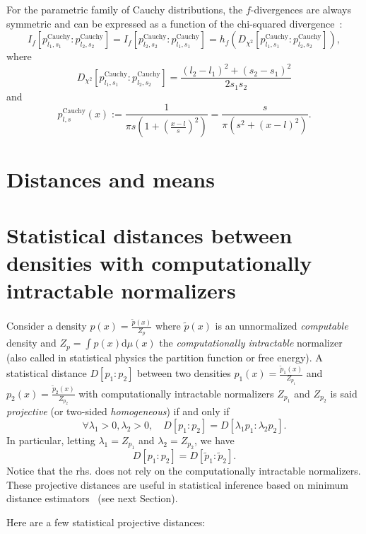 \documentclass[11pt]{article}
\def\dmu{\mathrm{d}\mu}
\def\dmu{\mathrm{d}\mu}
\def\Cauchy{\mathrm{Cauchy}}
\begin{document}
For the parametric family of Cauchy distributions, the $f$-divergences are always symmetric and can be expressed as a function of the chi-squared divergence~\cite{fdivCauchy-2021}:
$$
I_f[p_{l_1,s_1}^\Cauchy:p_{l_2,s_2}^\Cauchy]=I_f[p_{l_2,s_2}^\Cauchy:p_{l_1,s_1}^\Cauchy]=h_f(D_{\chi^2}[p_{l_1,s_1}^\Cauchy:p_{l_2,s_2}^\Cauchy]),
$$
where
$$
D_{\chi^2}[p_{l_1,s_1}^\Cauchy:p_{l_2,s_2}^\Cauchy]=\frac{(l_2-l_1)^2+(s_2-s_1)^2}{2s_1s_2}
$$
and
$$
p_{l,s}^\Cauchy(x) := \frac{1}{\pi s\left(1+\left(\frac{x-l}{s}\right)^2\right)}=\frac{s}{\pi (s^2+(x-l)^2)}.
$$


\section{Distances and means}



\section{Statistical distances between densities with computationally intractable normalizers}

Consider a density $p(x)=\frac{\tilde p(x)}{Z_p}$ where $\tilde p(x)$ is an unnormalized {\em computable} density 
and $Z_p=\int p(x) \dmu(x)$ the {\em computationally intractable} normalizer (also called in statistical physics the partition function or free energy).
A statistical distance $D[p_1:p_2]$ between two densities $p_1(x)=\frac{\tilde p_1(x)}{Z_{p_1}}$ and $p_2(x)=\frac{\tilde p_2(x)}{Z_{p_2}}$ with computationally intractable normalizers $Z_{p_1}$ and $Z_{p_2}$ is said {\em projective} (or two-sided {\em homogeneous}) if and only if
$$
\forall \lambda_1>0,\lambda_2>0,\quad D[p_1:p_2]=D[\lambda_1p_1:\lambda_2 p_2].
$$
In particular, letting $\lambda_1=Z_{p_1}$ and $\lambda_2=Z_{p_2}$, we have
$$
D[p_1:p_2]=D[\tilde{p}_1:\tilde{p}_2].
$$
Notice that the rhs. does not rely on the computationally intractable normalizers.
These projective distances are useful in statistical inference based on minimum distance estimators~\cite{MinDistance-2019} (see next Section).


Here are a few statistical projective distances:
\end{document}
